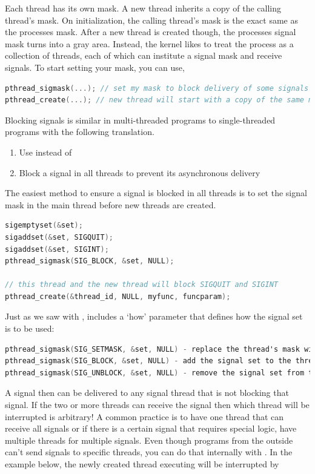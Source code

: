 Each thread has its own mask.
A new thread inherits a copy of the calling thread's mask.
On initialization, the calling thread's mask is the exact same as the processes mask.
After a new thread is created though, the processes signal mask turns into a gray area.
Instead, the kernel likes to treat the process as a collection of threads, each of which can institute a signal mask and receive signals.
To start setting your mask, you can use,

\begin{lstlisting}[language=C]
pthread_sigmask(...); // set my mask to block delivery of some signals
pthread_create(...); // new thread will start with a copy of the same mask
\end{lstlisting}

Blocking signals is similar in multi-threaded programs to single-threaded programs with the following translation.

\begin{enumerate}
\item Use  instead of 
\item Block a signal in all threads to prevent its asynchronous delivery
\end{enumerate}

The easiest method to ensure a signal is blocked in all threads is to set the signal mask in the main thread before new threads are created.

\begin{lstlisting}[language=C]
sigemptyset(&set);
sigaddset(&set, SIGQUIT);
sigaddset(&set, SIGINT);
pthread_sigmask(SIG_BLOCK, &set, NULL);

// this thread and the new thread will block SIGQUIT and SIGINT
pthread_create(&thread_id, NULL, myfunc, funcparam);
\end{lstlisting}

Just as we saw with ,  includes a `how' parameter that defines how the signal set is to be used:

\begin{lstlisting}[language=C]
pthread_sigmask(SIG_SETMASK, &set, NULL) - replace the thread's mask with given signal set
pthread_sigmask(SIG_BLOCK, &set, NULL) - add the signal set to the thread's mask
pthread_sigmask(SIG_UNBLOCK, &set, NULL) - remove the signal set from the thread's mask
\end{lstlisting}

A signal then can be delivered to any signal thread that is not blocking that signal.
If the two or more threads can receive the signal then which thread will be interrupted is arbitrary!
A common practice is to have one thread that can receive all signals or if there is a certain signal that requires special logic, have multiple threads for multiple signals.
Even though programs from the outside can't send signals to specific threads, you can do that internally with .
In the example below, the newly created thread executing  will be interrupted by 

